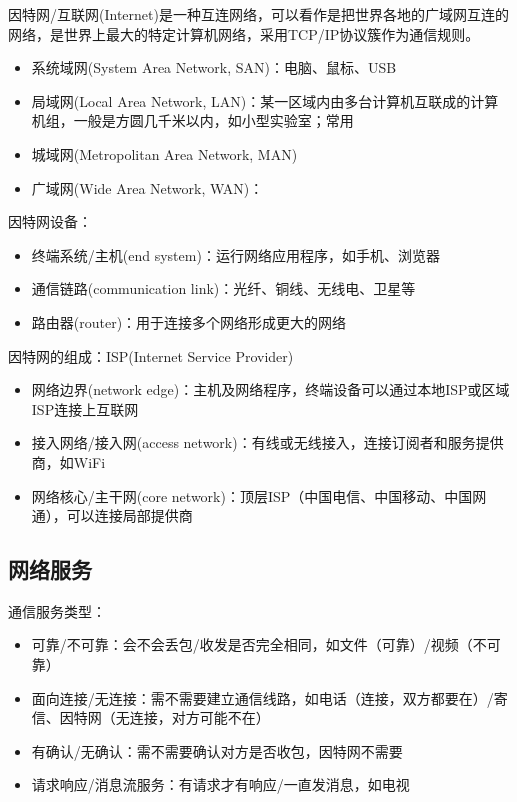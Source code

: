 \begin{parttext}
因特网/互联网(Internet)是一种互连网络，可以看作是把世界各地的广域网互连的网络，是世界上最大的特定计算机网络，采用TCP/IP协议簇作为通信规则。
\begin{itemize}
	\item 系统域网(System Area Network, SAN)：电脑、鼠标、USB
	\item 局域网(Local Area Network, LAN)：某一区域内由多台计算机互联成的计算机组，一般是方圆几千米以内，如小型实验室；常用
	\item 城域网(Metropolitan Area Network, MAN)
	\item 广域网(Wide Area Network, WAN)：
\end{itemize}
\end{parttext}

因特网设备：
\begin{itemize}
	\item 终端系统/主机(end system)：运行网络应用程序，如手机、浏览器
	\item 通信链路(communication link)：光纤、铜线、无线电、卫星等
	\item 路由器(router)：用于连接多个网络形成更大的网络
\end{itemize}

\begin{parttext}
因特网的组成：ISP(Internet Service Provider)
\begin{itemize}
	\item 网络边界(network edge)：主机及网络程序，终端设备可以通过本地ISP或区域ISP连接上互联网
	\item 接入网络/接入网(access network)：有线或无线接入，连接订阅者和服务提供商，如WiFi
	\item 网络核心/主干网(core network)：顶层ISP（中国电信、中国移动、中国网通），可以连接局部提供商
\end{itemize}
\end{parttext}

\subsection{网络服务}
通信服务类型：
\begin{itemize}
	\item 可靠/不可靠：会不会丢包/收发是否完全相同，如文件（可靠）/视频（不可靠）
	\item 面向连接/无连接：需不需要建立通信线路，如电话（连接，双方都要在）/寄信、因特网（无连接，对方可能不在）
	\item 有确认/无确认：需不需要确认对方是否收包，因特网不需要
	\item 请求响应/消息流服务：有请求才有响应/一直发消息，如电视
\end{itemize}

